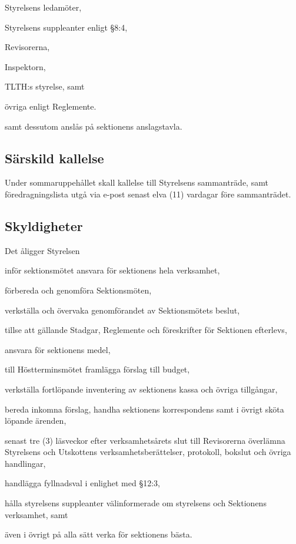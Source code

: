 \documentclass[10pt]{article}
\begin{document}
    \begin{alphlist}
    \item Styrelsens ledamöter,
    \item Styrelsens suppleanter enligt \S8:4,
    \item Revisorerna,
    \item Inspektorn,
    \item TLTH:s styrelse, samt
    \item övriga enligt Reglemente.
    \end{alphlist}
    
    samt dessutom anslås på sektionens anslagstavla.
    
    \subsection{Särskild kallelse}
    Under sommaruppehållet skall kallelse till Styrelsens sammanträde, samt
    föredragningslista utgå via e-post senast elva (11) vardagar före sammanträdet.
    
    \subsection{Skyldigheter}
    Det åligger Styrelsen
    \begin{attlist}
    \item inför sektionsmötet ansvara för sektionens hela verksamhet,
    \item förbereda och genomföra Sektionsmöten,
    \item verkställa och övervaka genomförandet av Sektionsmötets beslut,
    \item tillse att gällande Stadgar, Reglemente och föreskrifter för
        Sektionen efterlevs,
    \item ansvara för sektionens medel,
    \item till Höstterminsmötet framlägga förslag till budget,
    \item verkställa fortlöpande inventering av sektionens kassa och övriga
        tillgångar,
    \item bereda inkomna förslag, handha sektionens korrespondens samt i övrigt
        sköta löpande ärenden,
    \item senast tre (3) läsveckor efter verksamhetsårets slut till Revisorerna
        överlämna Styrelsens och Utskottens verksamhetsberättelser, protokoll,
        bokslut och övriga handlingar,
    \item handlägga fyllnadsval i enlighet med §12:3,
    \item hålla styrelsens suppleanter välinformerade om styrelsens och Sektionens verksamhet, samt
    \item även i övrigt på alla sätt verka för sektionens bästa.
    \end{attlist}
    
\end{document}
